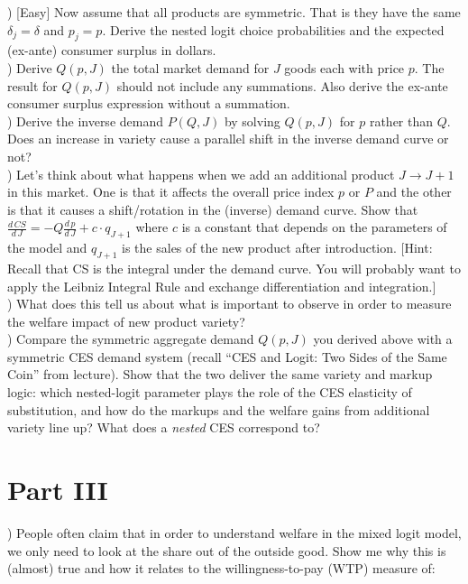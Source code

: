\documentclass[12pt]{article}
\begin{document}
) [Easy] Now assume that all products are symmetric. That is they have the same $\delta_j = \delta$ and $p_j = p$. Derive the nested logit choice probabilities and the expected (ex-ante) consumer surplus in dollars. \\

) Derive $Q(p,J)$ the total market demand for $J$ goods each with price $p$. The result for $Q(p,J)$ should not include any summations. Also derive the ex-ante consumer surplus expression without a summation.\\

) Derive the inverse demand $P(Q,J)$ by solving $Q(p,J)$ for $p$ rather than $Q$. Does an increase in variety cause a parallel shift in the inverse demand curve or not?\\

) Let's think about what happens when we add an additional product $J \rightarrow J+1$ in this market. One is that it affects the overall price index $p$ or $P$ and the other is that it causes a shift/rotation in the (inverse) demand curve. Show that $\frac{d\, CS}{d\, J} = -Q \frac{d\, p}{d\, J} +  c \cdot q_{J+1}$ where $c$ is a constant that depends on the parameters of the model and $q_{J+1}$ is the sales of the new product after introduction. [Hint: Recall that CS is the integral under the demand curve. You will probably want to apply the Leibniz Integral Rule and exchange differentiation and integration.]\\


) What does this tell us about what is important to observe in order to measure the welfare impact of new product variety?\\

) Compare the symmetric aggregate demand $Q(p,J)$ you derived above with a symmetric CES demand system (recall ``CES and Logit: Two Sides of the Same Coin'' from lecture). Show that the two deliver the same variety and markup logic: which nested-logit parameter plays the role of the CES elasticity of substitution, and how do the markups and the welfare gains from additional variety line up? What does a \textit{nested} CES correspond to?


\section*{\normalsize Part III}
) People often claim that in order to understand welfare in the mixed logit model, we only need to look at the share out of the outside good. Show me why this is (almost) true and how it relates to the willingness-to-pay (WTP) measure of:
\end{document}
